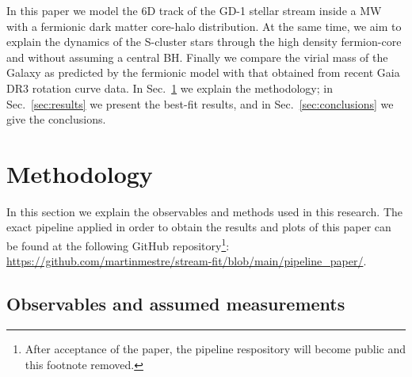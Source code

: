 \documentclass[twocolumn]{aa}
\begin{document}
In this paper we model the 6D track of the GD-1 stellar stream inside a MW with a fermionic dark matter core-halo distribution. At the same time, we aim to explain the dynamics of the S-cluster stars through the high density fermion-core and without assuming a central BH. Finally we compare the virial mass of the Galaxy as predicted by the fermionic model with that obtained from recent Gaia DR3 rotation curve data. In Sec.~\ref{sec:methodology} we explain the methodology; in Sec.~\ref{sec:results} we present the best-fit results, and in Sec.~\ref{sec:conclusions} we give the conclusions.

\section{Methodology}
\label{sec:methodology}
In this section we explain the observables and methods used in this research.
The exact pipeline applied in order to obtain the results and plots of this paper
can be found at the following GitHub repository\footnote{After acceptance of the paper, 
the pipeline respository will become public and this footnote removed.}:
\url{https://github.com/martinmestre/stream-fit/blob/main/pipeline_paper/}.

\subsection{Observables and assumed measurements}
\label{sec:observables}
\end{document}
